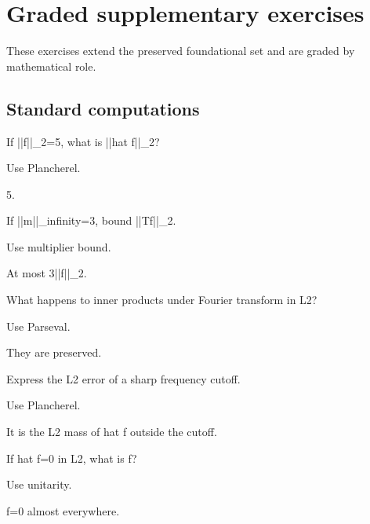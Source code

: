 \section{Graded supplementary exercises}
These exercises extend the preserved foundational set and are graded by mathematical role.

\subsection*{Standard computations}

\begin{exercise}[Energy]\label{exr:iii13-expand-01}
If ||f||\_2=5, what is ||hat f||\_2?
\end{exercise}
\begin{hint}
Use Plancherel.
\end{hint}
\begin{solution}
5.
\end{solution}

\begin{exercise}[Multiplier]\label{exr:iii13-expand-02}
If ||m||\_infinity=3, bound ||Tf||\_2.
\end{exercise}
\begin{hint}
Use multiplier bound.
\end{hint}
\begin{solution}
At most 3||f||\_2.
\end{solution}

\begin{exercise}[Parseval]\label{exr:iii13-expand-03}
What happens to inner products under Fourier transform in L2?
\end{exercise}
\begin{hint}
Use Parseval.
\end{hint}
\begin{solution}
They are preserved.
\end{solution}

\begin{exercise}\label{exr:iii13-expand-04}
Express the L2 error of a sharp frequency cutoff.
\end{exercise}
\begin{hint}
Use Plancherel.
\end{hint}
\begin{solution}
It is the L2 mass of hat f outside the cutoff.
\end{solution}

\begin{exercise}\label{exr:iii13-expand-05}
If hat f=0 in L2, what is f?
\end{exercise}
\begin{hint}
Use unitarity.
\end{hint}
\begin{solution}
f=0 almost everywhere.
\end{solution}


